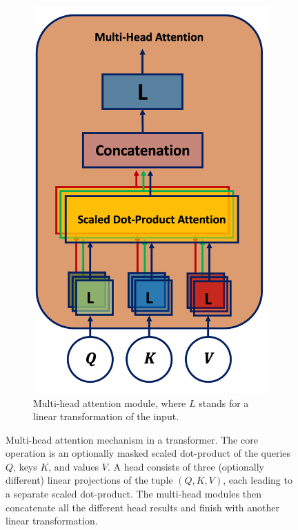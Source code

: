 \begin{figure}[h!]
\begin{subfigure}[b]{0.5\textwidth}
        \includegraphics[scale=0.65]{Images/ML/multiHeadAtt.png}
        \caption{Multi-head attention module, where $L$ stands for a linear transformation of the input.} 
        \label{fig:mulitheadAtt}
    \end{subfigure}
    \caption{Multi-head attention mechanism in a transformer. The core operation is an optionally masked scaled dot-product of the queries $Q$, keys $K$, and values $V$. A head consists of three (optionally different) linear projections of the tuple $(Q, K, V)$, each leading to a separate scaled dot-product. The multi-head modules then concatenate all the different head results and finish with another linear transformation.}
    \label{fig:transAtt}
\end{figure} 


